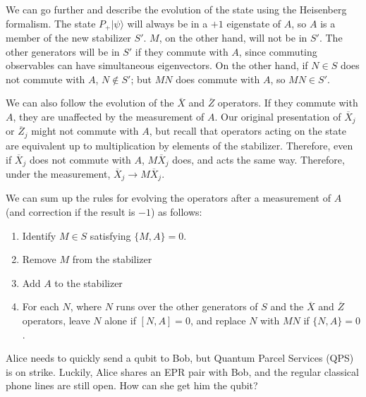 We can go further and describe the evolution of the state using the
Heisenberg formalism.  The state $P_+ |\psi\rangle$ will always be in
a $+1$ eigenstate of $A$, so $A$ is a member of the new stabilizer
$S'$.  $M$, on the other hand, will not be in $S'$.  The other
generators will be in $S'$ if they commute with $A$, since commuting
observables can have simultaneous eigenvectors.  On the other hand, if
$N \in S$ does not commute with $A$, $N \notin S'$; but $M N$ does
commute with $A$, so $M N \in S'$.

We can also follow the evolution of the $\overline{X}$ and
$\overline{Z}$ operators.  If they commute with $A$, they are
unaffected by the measurement of $A$.  Our original presentation of
$\overline{X}_j$ or $\overline{Z}_j$ might not commute with $A$, but
recall that operators acting on the state are equivalent up to
multiplication by elements of the stabilizer.  Therefore, even if
$\overline{X}_j$ does not commute with $A$, $M \overline{X}_j$ does,
and acts the same way.  Therefore, under the measurement,
$\overline{X}_j \rightarrow M \overline{X}_j$.

We can sum up the rules for evolving the operators after a measurement
of $A$ (and correction if the result is $-1$) as follows:
\begin{enumerate}
\item Identify $M \in S$ satisfying $\{M, A\} = 0$.
\item Remove $M$ from the stabilizer
\item Add $A$ to the stabilizer
\item For each $N$, where $N$ runs over the other generators of $S$
and the $\overline{X}$ and $\overline{Z}$ operators, leave $N$ alone
if $[N, A] = 0$, and replace $N$ with $MN$ if $\{N, A\} = 0$.
\end{enumerate}

\begin{example}
Alice needs to quickly send a qubit to Bob, but Quantum Parcel
Services (QPS) is on strike.  Luckily, Alice shares an EPR pair with
Bob, and the regular classical phone lines are still open.  How can
she get him the qubit?
\end{example}

